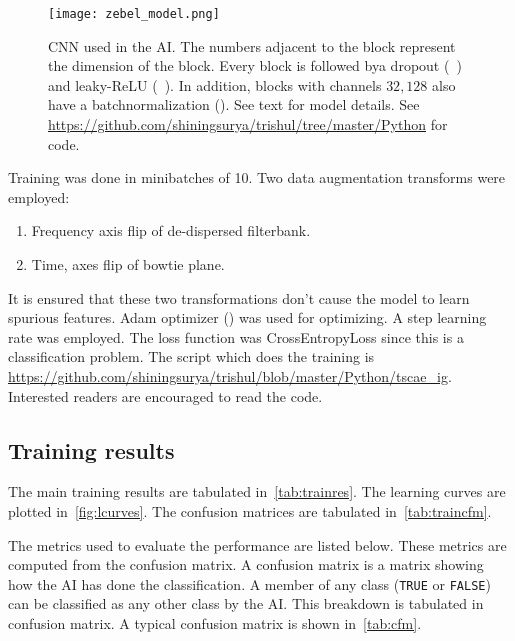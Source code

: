 \begin{figure}
	\label{fig:mlmodel}
	\centering
	\texttt{[image: zebel\_model.png]}
	\caption{CNN used in the AI. The numbers adjacent to the block represent the dimension of the block. Every block is followed bya dropout (~\cite{dropout2d,dropout}) and leaky-ReLU (~\cite{lrelu}). In addition, blocks with channels $32, 128$ also have a batchnormalization (\cite{batchnorm}). See text for model details. See \url{https://github.com/shiningsurya/trishul/tree/master/Python} for code.}
\end{figure}

\par Training was done in minibatches of 10. Two data augmentation transforms were employed:
\begin{enumerate}
	\item Frequency axis flip of de-dispersed filterbank.
	\item Time, \dm axes flip of bowtie plane.
\end{enumerate}
It is ensured that these two transformations don't cause the model to learn spurious features.
Adam optimizer (\cite{adam}) was used for optimizing. A step learning rate was employed. 
The loss function was CrossEntropyLoss since this is a classification problem.
The script which does the training is \url{https://github.com/shiningsurya/trishul/blob/master/Python/tscae_ig}.
Interested readers are encouraged to read the code.

\subsection{Training results}
\label{ssub:training}
\par The main training results are tabulated in~\autoref{tab:trainres}. 
The learning curves are plotted in~\autoref{fig:lcurves}.
The confusion matrices are tabulated in~\autoref{tab:traincfm}.

\par The metrics used to evaluate the performance are listed below. 
These metrics are computed from the confusion matrix.
A confusion matrix is a matrix showing how the AI has done the classification. A member of any class (\texttt{TRUE} or \texttt{FALSE}) can be classified as any other class by the AI.
This breakdown is tabulated in confusion matrix. A typical confusion matrix is shown in~\autoref{tab:cfm}.

